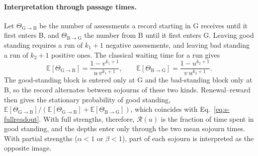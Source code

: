 \documentclass[fleqn,10pt]{wlscirep}
\newcommand{\Rmap}{\mathscr{R}}            %
\theoremstyle{plain}
\begin{document}
\paragraph{Interpretation through passage times.} Let $\Theta_{\mathrm G\to\mathrm B}$ be the number of assessments a record starting in G receives until it first enters B, and $\Theta_{\mathrm B\to\mathrm G}$ the number from B until it first enters G. Leaving good standing requires a run of $k_1+1$ negative assessments, and leaving bad standing a run of $k_2+1$ positive ones. The classical waiting time for a run gives
\begin{equation}
\mathbb E[\Theta_{\mathrm G\to\mathrm B}]=\frac{1-v^{k_1+1}}{u\,v^{k_1+1}},\qquad
\mathbb E[\Theta_{\mathrm B\to\mathrm G}]=\frac{1-u^{k_2+1}}{v\,u^{k_2+1}}.
\label{eq:s-passage}
\end{equation}
The good-standing block is entered only at G and the bad-standing block only at B, so the record alternates between sojourns of these two kinds. Renewal--reward then gives the stationary probability of good standing, $\mathbb E[\Theta_{\mathrm G\to\mathrm B}]/(\mathbb E[\Theta_{\mathrm G\to\mathrm B}]+\mathbb E[\Theta_{\mathrm B\to\mathrm G}])$, which coincides with Eq.~\eqref{eq:s-fullreadout}. With full strengths, therefore, $\Rmap(u)$ is the fraction of time spent in good standing, and the depths enter only through the two mean sojourn times. With partial strengths ($\alpha<1$ or $\beta<1$), part of each sojourn is interpreted as the opposite image.
\end{document}
